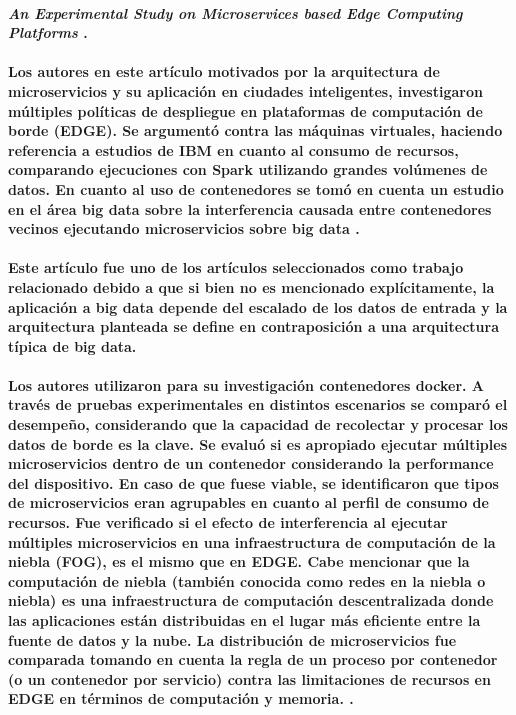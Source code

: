\paragraph{
  \textbf{\emph{An Experimental Study on Microservices based Edge Computing Platforms}}
  \cite{qu_experimental_2020}.
}

\paragraph{
  Los autores en este artículo motivados por la arquitectura de microservicios y su aplicación en ciudades inteligentes, investigaron múltiples políticas de despliegue en plataformas de computación de borde (EDGE). Se argumentó contra las máquinas virtuales, haciendo referencia a estudios de IBM en cuanto al consumo de recursos, comparando ejecuciones con Spark \cite{ApacheSpark} utilizando grandes volúmenes de datos. En cuanto al uso de contenedores se tomó en cuenta un estudio en el área big data sobre la interferencia causada entre contenedores vecinos ejecutando microservicios sobre big data \cite{BigDataWikipedia}.
}

\paragraph{
  Este artículo fue uno de los artículos seleccionados como trabajo relacionado debido a que si bien no es mencionado explícitamente, la aplicación a big data depende del escalado de los datos de entrada y la arquitectura planteada se define en contraposición a una arquitectura típica de big data.
}

\paragraph{
  Los autores utilizaron para su investigación contenedores docker.
  A través de pruebas experimentales en distintos escenarios se comparó el desempeño, considerando que la capacidad de recolectar y procesar los datos de borde es la clave.
  Se evaluó si es apropiado ejecutar múltiples microservicios dentro de un contenedor considerando la performance del dispositivo.
  En caso de que fuese viable, se identificaron que tipos de microservicios eran agrupables en cuanto al perfil de consumo de recursos.
  Fue verificado si el efecto de interferencia al ejecutar múltiples microservicios en una infraestructura de computación de la niebla (FOG), es el mismo que en EDGE. Cabe mencionar que la computación de niebla (también conocida como redes en la niebla o niebla)
  es una infraestructura de computación descentralizada donde las aplicaciones están distribuidas en el lugar más eficiente entre la fuente de datos y la nube.
  La distribución de microservicios fue comparada tomando en cuenta la regla de un proceso por contenedor (o un contenedor por servicio)
  \cite{cont_por_serv}
  contra las limitaciones de recursos en EDGE en términos de computación y memoria.
  \cite{webfog}.
}

